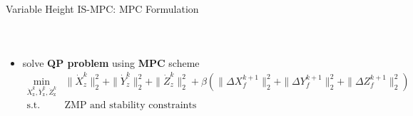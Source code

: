 \documentclass[10pt]{beamer}
\begin{document}
\begin{frame}{Variable Height IS-MPC: MPC Formulation}
\begin{columns}[c,onlytextwidth]
\begin{figure}
      \end{figure}
	\end{columns}
	\begin{itemize}
		\item solve \textbf{QP problem} using \textbf{MPC} scheme
			\begin{align*}
				\min_{\dot{X}_\text{z}^k, \dot{Y}_\text{z}^k, \dot{Z}_\text{z}^k}
						&\|\dot{X}_z^k\|_2^2 + \|\dot{Y}_z^k\|_2^2 + \|\dot{Z}_z^k\|_2^2 +
						\beta ( \|\Delta X_f^{k+1}\|_2^2 + \|\Delta Y_f^{k+1}\|_2^2 +
						\|\Delta Z_f^{k+1}\|_2^2 ) \\
						\text{s.t. } &\text{ZMP and stability constraints}
			\end{align*}
	\end{itemize}
\end{frame}
\end{document}
